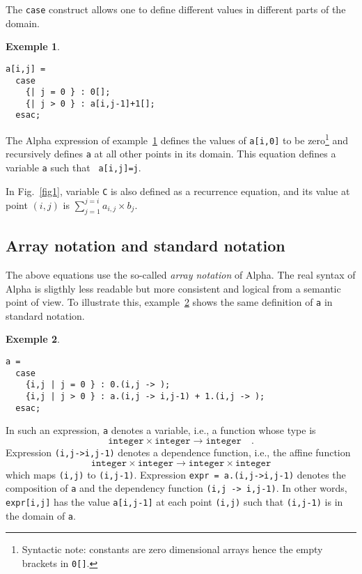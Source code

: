 \documentclass[12pt]{article}
\newcommand{\Alpha}{{\sc Alpha}}
\newcommand{\alfa}{\Alpha}
\newtheorem{ex}{Exemple}[section]
\begin{document}
The {\tt case}
construct allows one to define different values in different parts of
the domain.

\begin{ex}{~}
\begin{verbatim}
a[i,j] = 
  case
    {| j = 0 } : 0[];
    {| j > 0 } : a[i,j-1]+1[];
  esac;
\end{verbatim}
\label{ex2} 
\end{ex}

The {\Alpha} expression of example~\ref{ex2} defines the values of
\texttt{a[i,0]} to be zero\footnote{Syntactic note: constants are zero
dimensional arrays hence the empty brackets in \texttt{0[]}.}
and recursively defines {\tt a} at all other points in its
domain. This equation defines a variable {\tt a} such that {\tt
a[i,j]=j}. 

In Fig.~\ref{fig1}, variable \texttt{C} is also defined as
a recurrence equation, and its value at point $(i,j)$ 
is $\sum_{j=1}^{j=i} a_{i,j} \times b_{j}$.

\subsection{Array notation and standard notation}
The above equations use the so-called 
{\em array notation} of \alfa{}. 
The
real syntax of {\Alpha} is sligthly less readable but more consistent
and logical from a semantic point of view. To illustrate this,
example~\ref{ex3} shows the same definition of {\tt a} in standard
notation.
\begin{ex}{~}
\begin{verbatim}
a = 
  case
    {i,j | j = 0 } : 0.(i,j -> );
    {i,j | j > 0 } : a.(i,j -> i,j-1) + 1.(i,j -> );
  esac;
\end{verbatim}
\label{ex3}
\end{ex}

\newcommand{\integer}{\texttt{integer}}
In such an expression, \texttt{a} denotes a variable, i.e., 
a function whose type is 
$$\integer{} \times \integer{} \rightarrow \integer{} \quad.$$
Expression \texttt{(i,j->i,j-1)} denotes
a dependence function, i.e., the affine function 
$$\integer{} \times \integer{} \rightarrow \integer{} \times \integer{}$$
which maps \texttt{(i,j)} to \texttt{(i,j-1)}. 
Expression \texttt{expr = a.(i,j->i,j-1)} denotes
the composition of \texttt{a} and the dependency function 
\texttt{(i,j -> i,j-1)}. 
In
other words, {\tt expr[i,j]} has the value {\tt a[i,j-1]} at each point
\texttt{(i,j)} such that \texttt{(i,j-1)} is in the domain of {\tt a}. 
\end{document}
